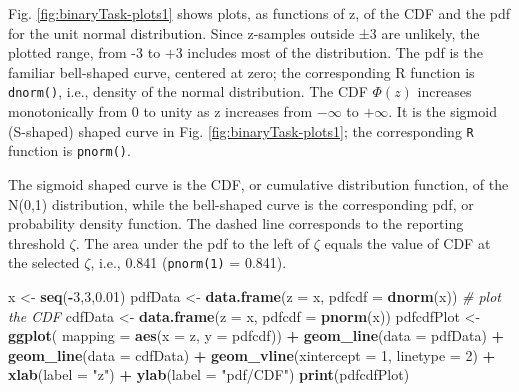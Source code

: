 \documentclass[
]{book}
\newenvironment{Shaded}{\begin{snugshade}}{\end{snugshade}}
\newcommand{\CommentTok}[1]{\textcolor[rgb]{0.56,0.35,0.01}{\textit{#1}}}
\newcommand{\DataTypeTok}[1]{\textcolor[rgb]{0.13,0.29,0.53}{#1}}
\newcommand{\DecValTok}[1]{\textcolor[rgb]{0.00,0.00,0.81}{#1}}
\newcommand{\FloatTok}[1]{\textcolor[rgb]{0.00,0.00,0.81}{#1}}
\newcommand{\KeywordTok}[1]{\textcolor[rgb]{0.13,0.29,0.53}{\textbf{#1}}}
\newcommand{\NormalTok}[1]{#1}
\newcommand{\OperatorTok}[1]{\textcolor[rgb]{0.81,0.36,0.00}{\textbf{#1}}}
\newcommand{\StringTok}[1]{\textcolor[rgb]{0.31,0.60,0.02}{#1}}
\begin{document}
Fig. \ref{fig:binaryTask-plots1} shows plots, as functions of z, of the CDF and the pdf for the unit normal distribution. Since z-samples outside ±3 are unlikely, the plotted range, from -3 to +3 includes most of the distribution. The pdf is the familiar bell-shaped curve, centered at zero; the corresponding R function is \texttt{dnorm()}, i.e., density of the normal distribution. The CDF \(\Phi(z)\) increases monotonically from 0 to unity as z increases from \(-\infty\) to \(+\infty\). It is the sigmoid (S-shaped) shaped curve in Fig. \ref{fig:binaryTask-plots1}; the corresponding \texttt{R} function is \texttt{pnorm()}.

The sigmoid shaped curve is the CDF, or cumulative distribution function, of the N(0,1) distribution, while the bell-shaped curve is the corresponding pdf, or probability density function. The dashed line corresponds to the reporting threshold \(\zeta\). The area under the pdf to the left of \(\zeta\) equals the value of CDF at the selected \(\zeta\), i.e., 0.841 (\texttt{pnorm(1)} = 0.841).

\begin{Shaded}
\begin{Highlighting}[]
\NormalTok{x \textless{}{-}}\StringTok{ }\KeywordTok{seq}\NormalTok{(}\OperatorTok{{-}}\DecValTok{3}\NormalTok{,}\DecValTok{3}\NormalTok{,}\FloatTok{0.01}\NormalTok{)}
\NormalTok{pdfData \textless{}{-}}\StringTok{ }\KeywordTok{data.frame}\NormalTok{(}\DataTypeTok{z =}\NormalTok{ x, }\DataTypeTok{pdfcdf =} \KeywordTok{dnorm}\NormalTok{(x))}
\CommentTok{\# plot the CDF}
\NormalTok{cdfData \textless{}{-}}\StringTok{ }\KeywordTok{data.frame}\NormalTok{(}\DataTypeTok{z =}\NormalTok{ x, }\DataTypeTok{pdfcdf =} \KeywordTok{pnorm}\NormalTok{(x))}
\NormalTok{pdfcdfPlot \textless{}{-}}\StringTok{ }\KeywordTok{ggplot}\NormalTok{(}
  \DataTypeTok{mapping =} \KeywordTok{aes}\NormalTok{(}\DataTypeTok{x =}\NormalTok{ z, }\DataTypeTok{y =}\NormalTok{ pdfcdf)) }\OperatorTok{+}\StringTok{ }
\StringTok{  }\KeywordTok{geom\_line}\NormalTok{(}\DataTypeTok{data =}\NormalTok{ pdfData) }\OperatorTok{+}\StringTok{ }
\StringTok{  }\KeywordTok{geom\_line}\NormalTok{(}\DataTypeTok{data =}\NormalTok{ cdfData) }\OperatorTok{+}
\StringTok{  }\KeywordTok{geom\_vline}\NormalTok{(}\DataTypeTok{xintercept =} \DecValTok{1}\NormalTok{, }\DataTypeTok{linetype =} \DecValTok{2}\NormalTok{) }\OperatorTok{+}\StringTok{ }
\StringTok{  }\KeywordTok{xlab}\NormalTok{(}\DataTypeTok{label =} \StringTok{"z"}\NormalTok{) }\OperatorTok{+}\StringTok{ }\KeywordTok{ylab}\NormalTok{(}\DataTypeTok{label =} \StringTok{"pdf/CDF"}\NormalTok{)}
\KeywordTok{print}\NormalTok{(pdfcdfPlot)}
\end{Highlighting}
\end{Shaded}
\end{document}
